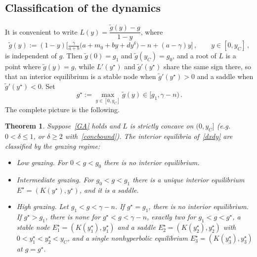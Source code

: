 \documentclass[reqno,11pt]{amsart}
\newtheorem{thm}{Theorem}[section]
\numberwithin{equation}{section}
\begin{document}
\smallskip

\subsection{Classification of the dynamics}\label{subsec:classification}

It is convenient to write $L(y)=\dfrac{\tilde g(y)-g}{1-y}$,
where
\begin{equation}\label{tildeg}
\tilde g(y):=(1-y)\Big[\tfrac{\gamma}{a+b}\big(a+m_0+by+dy^{\delta}\big)-n+(a-\gamma)y\Big]\,,\qquad y\in[0,y_C]\,,
\end{equation}
is independent of $g$. Then $\tilde g(0)=g_1$ and $\tilde g(y_C)=g_0$, and a root of $L$ is a point where $\tilde g(y)=g$, while $L'(y^\star)$ and $\tilde g'(y^\star)$ share the same sign there, so that an interior equilibrium is a stable node when $\tilde g'(y^\star)>0$ and a saddle when $\tilde g'(y^\star)<0$. Set
\begin{equation}\label{gstar}
g^\star:=\max_{y\in[0,y_C]}\tilde g(y)\in[g_1,\gamma-n)\,.
\end{equation}
The complete picture is the following.

\begin{thm}\label{thm:classification}
Suppose~\eqref{GA} holds and $L$ is strictly concave on $(0,y_C]$ (e.g.\ $0<\delta\le1$, or $\delta\ge2$ with~\eqref{concbound}). The interior equilibria of~\eqref{dxdy} are classified by the grazing regime:
\begin{itemize}
\item[\textup{(i)}] \emph{Low grazing.} For $0<g<g_0$ there is no interior equilibrium.
\item[\textup{(ii)}] \emph{Intermediate grazing.} For $g_0<g<g_1$ there is a unique interior equilibrium $E^\star=(K(y^\star),y^\star)$, and it is a saddle.
\item[\textup{(iii)}] \emph{High grazing.} Let $g_1<g<\gamma-n$. If $g^\star=g_1$, there is no interior equilibrium. If $g^\star>g_1$, there is none for $g^\star<g<\gamma-n$, exactly two for $g_1<g<g^\star$, a stable node $E_1^\star=(K(y_1^\star),y_1^\star)$ and a saddle $E_2^\star=(K(y_2^\star),y_2^\star)$ with $0<y_1^\star<y_2^\star<y_C$, and a single nonhyperbolic equilibrium $E_3^\star=(K(y_3^\star),y_3^\star)$ at $g=g^\star$.
\end{itemize}
\end{thm}
\end{document}

